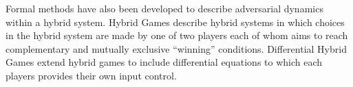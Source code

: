 Formal methods have also been developed to describe adversarial dynamics within a hybrid system.
Hybrid Games \citep{Platzer13:dGL} describe hybrid systems in which choices in the hybrid system are made by one of two players each of whom aims to reach complementary and mutually exclusive ``winning'' conditions.
Differential Hybrid Games \citep{DBLP:journals/tocl/Platzer17} extend hybrid games to include differential equations to which each players provides their own input control.